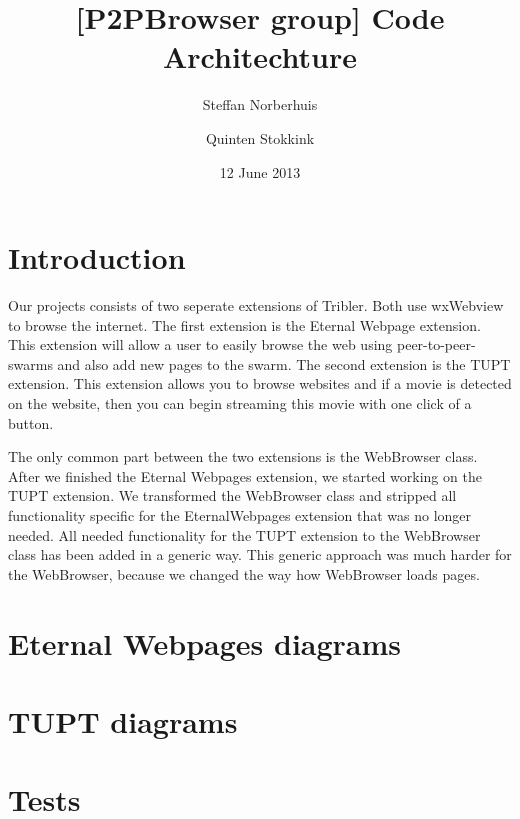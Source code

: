 \documentclass[a4paper,11pt]{article}
\title{[P2PBrowser group] Code Architechture}
\author{Steffan Norberhuis \and Quinten Stokkink}
\date{12 June 2013}
\begin{document}
   \maketitle

\section{Introduction}
Our projects consists of two seperate extensions of Tribler. Both use wxWebview to browse the internet.
The first extension is the Eternal Webpage extension.
This extension will allow a user to easily browse the web using peer-to-peer-swarms and also add new pages to the swarm.
The second extension is the TUPT extension.
This extension allows you to browse websites and if a movie is detected on the website,
then you can begin streaming this movie with one click of a button.

The only common part between the two extensions is the WebBrowser class.
After we finished the Eternal Webpages extension, we started working on the TUPT extension.
We transformed the WebBrowser class and stripped all functionality specific for the EternalWebpages extension that was no longer needed.
All needed functionality for the TUPT extension to the WebBrowser class has been added in a generic way.
This generic approach was much harder for the WebBrowser, because we changed the way how WebBrowser loads pages.

\section{Eternal Webpages diagrams}


\section{TUPT diagrams}


\section{Tests}

\end{document}
